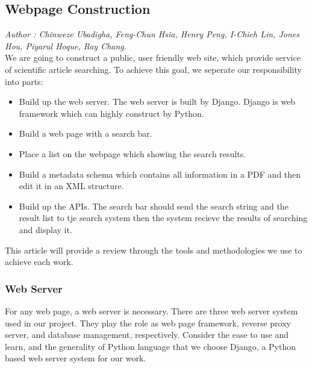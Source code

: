 \subsection{Webpage Construction}
\textit{\footnotesize Author : Chinweze Ubadigha, Feng-Chun Hsia, Henry Peng, I-Chieh Lin, Jones Hou, Piyarul Hoque, Ray Chang.}\\

We are going to construct a public, user friendly web site, which provide service of scientific article searching.
To achieve this goal, we seperate our responsibility into parts:\\
\begin{itemize}
	\item Build up the web server.
	The web server is built by Django. Django is web framework which can highly construct by Python.
	\item Build a web page with a search bar.
	\item Place a list on the webpage which showing the search results.
	\item Build a metadata schema which contains all information in a PDF and then edit it in an XML structure. 
	\item Build up the APIs. The search bar should send the search string and the result list to tje search system 
	then the system recieve the results of searching and display it.
\end{itemize}
This article will provide a review through the tools and methodologies we use to achieve each work.
\subsubsection{Web Server}
For any web page, a web server is necessary.
There are three web server system used in our project. 
They play the role as web page framework, reverse proxy server, 
and database management, respectively.
Consider the ease to use and learn, and the generality of Python language 
that we choose Django, a Python based web server system for our work.

